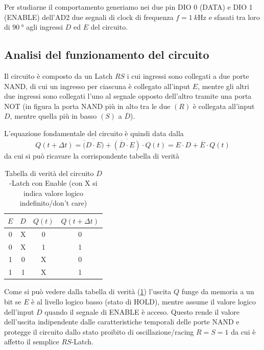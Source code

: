 \documentclass[10pt, a4paper, italian]{article}
\begin{document}
Per studiarne il comportamento generiamo nei due pin DIO 0 (DATA) e DIO 1
(ENABLE) dell'AD2 due segnali di clock di frequenza $f = \SI{1}{k\hertz}$ e
sfasati tra loro di $\SI{90}{\degree}$ agli ingressi $D$ ed $E$ del
circuito. 

\subsection{Analisi del funzionamento del circuito}
Il circuito è composto da un Latch $RS$ i cui ingressi sono collegati a due
porte NAND, di cui un ingresso per ciascuna è collegato all'input $E$, mentre
gli altri due ingressi sono collegati l'uno al segnale opposto dell'altro
tramite una porta NOT (in figura la porta NAND più in alto tra le due $(R)$ è
collegata all'input $D$, mentre quella più in basso $(S)$ a $\overline{D}$).

L'equazione fondamentale del circuito è quindi data dalla
\begin{equation}
Q(t + \Delta t) = \overline{\overline(D \cdot E)} +
\overline{(\overline{D} \cdot E)} \cdot Q(t) =
E \cdot D + \overline{E} \cdot Q(t)
\end{equation}
da cui si può ricavare la corrispondente tabella di verità
\begin{table}
\begin{center}
    \begin{tabular}{cccc}
      \toprule
      $E$ & $D$     & $Q(t)$  & $ Q(t + \Delta t)$ \\
      \midrule
      \midrule
      0     & X & 0         & 0 \\
      0     & X & 1         & 1 \\
      1     & 0         & X & 0 \\
      1     & 1         & X & 1 \\
      \bottomrule
    \end{tabular}
\end{center}
\caption{Tabella di verità del circuito $D$-Latch con Enable (con X si indica
valore logico indefinito/don't care) \label{tab: dlatch}}
\end{table}

Come si può vedere dalla tabella di verità (\cref{tab: dlatch}) l'uscita $Q$
funge da memoria a un bit se $E$ è al livello logico basso (stato di HOLD),
mentre assume il valore logico dell'input $D$ quando il segnale di ENABLE è
acceso.
Questo rende il valore dell'uscita indipendente dalle caratteristiche
temporali delle porte NAND e protegge il circuito dallo stato proibito di
oscillazione/racing $R = S = 1$ da cui è affetto il semplice $RS$-Latch.
\end{document}
